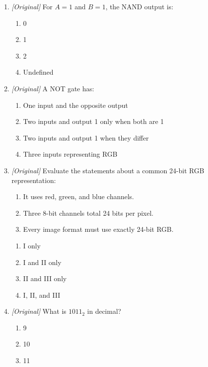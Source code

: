 \begin{enumerate}[label=\textbf{Q\arabic*.}, leftmargin=*]
  \begin{enumerate}[label=\Alph*.]
    \item OR
    \item XOR
    \item AND
    \item NOT
  \end{enumerate}
\item \textit{[Original]} For $A=1$ and $B=1$, the NAND output is:
  \begin{enumerate}[label=\Alph*.]
    \item 0
    \item 1
    \item 2
    \item Undefined
  \end{enumerate}
\item \textit{[Original]} A NOT gate has:
  \begin{enumerate}[label=\Alph*.]
    \item One input and the opposite output
    \item Two inputs and output 1 only when both are 1
    \item Two inputs and output 1 when they differ
    \item Three inputs representing RGB
  \end{enumerate}
\item \textit{[Original]} Evaluate the statements about a common 24-bit RGB
  representation:
  \begin{enumerate}[label=\Roman*.]
    \item It uses red, green, and blue channels.
    \item Three 8-bit channels total 24 bits per pixel.
    \item Every image format must use exactly 24-bit RGB.
  \end{enumerate}
  \begin{enumerate}[label=\Alph*.]
    \item I only
    \item I and II only
    \item II and III only
    \item I, II, and III
  \end{enumerate}
\item \textit{[Original]} What is $1011_2$ in decimal?
  \begin{enumerate}[label=\Alph*.]
    \item 9
    \item 10
    \item 11

\end{enumerate}
\end{enumerate}
